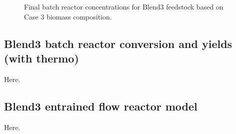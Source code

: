 \begin{figure}[H]
    \centering
    \caption{Final batch reactor concentrations for Blend3 feedstock based on Case 3 biomass composition.}
    \label{fig:blend3-case3-final}
\end{figure}

\subsection{Blend3 batch reactor conversion and yields (with thermo)}

Here.

\subsection{Blend3 entrained flow reactor model}

Here.

